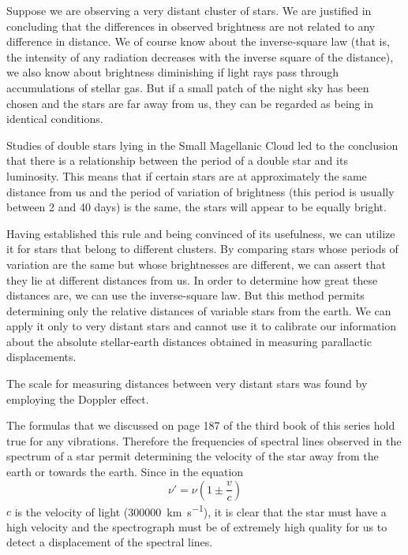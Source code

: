 Suppose we are observing a very distant cluster of stars. We are justified in concluding that the differences in observed brightness are not related to any difference in distance. We of course know about the inverse-square law (that is, the intensity of any radiation decreases with the inverse square of the distance), we also know about brightness diminishing if light rays pass through accumulations of stellar gas. But if a small patch of the night sky has been chosen and the stars are far away from us, they can be regarded as being in identical conditions.

Studies of double stars lying in the Small Magellanic Cloud led to the conclusion that there is a relationship between the period of a double star and its luminosity. This means that if certain stars are at approximately the same distance from us and the period of variation of brightness (this period is usually between 2 and 40 days) is the same, the stars will appear to be equally bright.

Having established this rule and being convinced of its usefulness, we can utilize it for stars that belong to different clusters. By comparing stars whose periods of variation are the same but whose brightnesses are different, we can assert that they lie at different distances from us. In order to determine how great these distances are, we can use the inverse-square law. But this method permits determining only the relative distances of variable stars from the earth. We can apply it only to very distant stars and cannot use it to calibrate our information about the absolute stellar-earth distances obtained in measuring parallactic displacements.

The scale for measuring distances between very distant stars was found by employing the Doppler effect.

The formulas that we discussed on page 187 of the third book of this series hold true for any vibrations. Therefore the frequencies of spectral lines observed in the spectrum of a star permit determining the velocity of the star away from the earth or towards the earth. Since in the equation
\begin{equation*}%
\nu' = \nu \left( 1 \pm \frac{v}{c} \right)
\end{equation*}
$c$ is the velocity of light (\SI{300000}{\kilo\meter\per\second}), it is clear that the star must have a high velocity and the spectrograph must be of extremely high quality for us to detect a dis­placement of the spectral lines.

